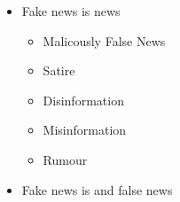 \documentclass[a4paper,landscape,headrule,footrule,xetex]{foils}
\begin{document}



\begin{itemize}
\item Fake news is  news
  \begin{itemize}
  \item Malicously False News
  \item Satire
  \item Disinformation
  \item Misinformation
  \item Rumour
  \end{itemize}
\item Fake news is  and  false news
\end{itemize}




\end{document}
